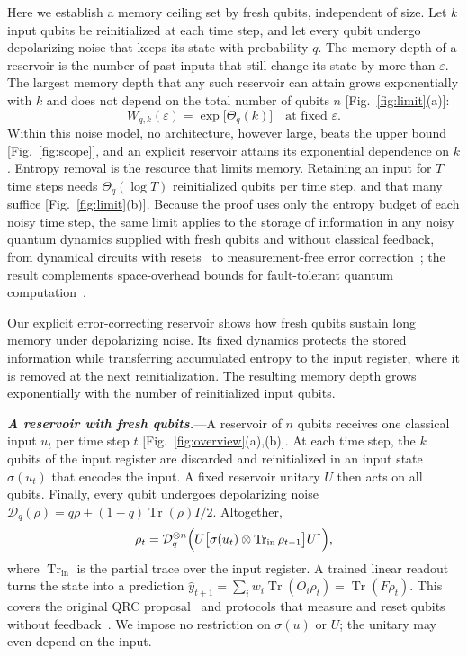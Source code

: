 \documentclass[aps,prl,twocolumn,superscriptaddress,floatfix]{revtex4-2}
\theoremstyle{plain}
\newcommand{\tr}{\operatorname{Tr}}
\newcommand{\cD}{\mathcal D}
\newcommand{\runin}[1]{\textit{\textbf{#1}}---}
\begin{document}
Here we establish a memory ceiling set by fresh qubits, independent of size. Let $k$ input qubits be reinitialized at each time step, and let every qubit undergo depolarizing noise that keeps its state with probability $q$. The memory depth of a reservoir is the number of past inputs that still change its state by more than $\varepsilon$. The largest memory depth that any such reservoir can attain grows exponentially with $k$ and does not depend on the total number of qubits $n$ [Fig.~\ref{fig:limit}(a)]:
\begin{equation}
W_{q,k}(\varepsilon)=\exp\!\big[\Theta_q(k)\big]\quad\text{at fixed }\varepsilon.
\label{eq:main}
\end{equation}
Within this noise model, no architecture, however large, beats the upper bound [Fig.~\ref{fig:scope}], and an explicit reservoir attains its exponential dependence on $k$. Entropy removal is the resource that limits memory. Retaining an input for $T$ time steps needs $\Theta_q(\log T)$ reinitialized qubits per time step, and that many suffice [Fig.~\ref{fig:limit}(b)]. Because the proof uses only the entropy budget of each noisy time step, the same limit applies to the storage of information in any noisy quantum dynamics supplied with fresh qubits and without classical feedback, from dynamical circuits with resets~\cite{Yasuda2023,Hu2024} to measurement-free error correction~\cite{Heussen2024}; the result complements space-overhead bounds for fault-tolerant quantum computation~\cite{Fawzi2022}.

Our explicit error-correcting reservoir shows how fresh qubits sustain long memory under depolarizing noise. Its fixed dynamics protects the stored information while transferring accumulated entropy to the input register, where it is removed at the next reinitialization. The resulting memory depth grows exponentially with the number of reinitialized input qubits.

\runin{A reservoir with fresh qubits.}A reservoir of $n$ qubits receives one classical input $u_t$ per time step $t$ [Fig.~\ref{fig:overview}(a),(b)]. At each time step, the $k$ qubits of the input register are discarded and reinitialized in an input state $\sigma(u_t)$ that encodes the input. A fixed reservoir unitary $U$ then acts on all qubits. Finally, every qubit undergoes depolarizing noise $\cD_q(\rho)=q\rho+(1-q)\tr(\rho)I/2$. Altogether,
\begin{equation}
\rho_t=\cD_q^{\otimes n}\Bigl(U\bigl[\sigma(u_t)\otimes\tr_{\mathrm{in}}\rho_{t-1}\bigr]U^\dagger\Bigr),
\label{eq:model}
\end{equation}
where $\tr_{\mathrm{in}}$ is the partial trace over the input register. A trained linear readout turns the state into a prediction $\hat y_{t+1}=\sum_iw_i\tr(O_i\rho_t)=\tr(F\rho_t)$. This covers the original QRC proposal~\cite{Fujii2017} and protocols that measure and reset qubits without feedback~\cite{Yasuda2023,Hu2024}. We impose no restriction on $\sigma(u)$ or $U$; the unitary may even depend on the input.
\end{document}
